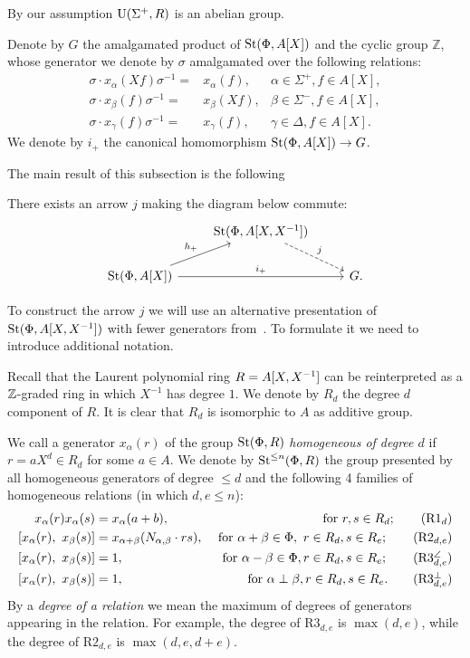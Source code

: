 By our assumption $\operatorname{U}(\Sigma^+, R)$ is an abelian group.

Denote by $G$ the amalgamated product of $\operatorname{St}(\Phi, A[X])$ and the cyclic group $\mathbb{Z}$, whose generator we denote by $\sigma$ amalgamated over the following relations:
\begin{align}
    \sigma \cdot x_{\alpha}(Xf) \sigma^{-1} =& x_{\alpha} (f), & \alpha \in \Sigma^+, f \in A[X], \\
    \sigma \cdot x_{\beta}(f) \sigma^{-1}   =& x_{\beta} (Xf), & \beta \in \Sigma^-, f \in A[X], \\
    \sigma \cdot x_\gamma(f) \sigma^{-1}    =& x_\gamma(f), & \gamma \in \Delta, f \in A[X].
\end{align}
We denote by $i_+$ the canonical homomorphism $\operatorname{St}(\Phi, A[X]) \to G$.

The main result of this subsection is the following
\begin{prop}
    There exists an arrow $j$ making the diagram below commute:
    \[\begin{tikzcd}           & \St(\Phi, A[X, X\inv]) \arrow[rd, dashrightarrow, "j"] & \\
           \St(\Phi, A[X]) \arrow{ru}{h_+} \arrow{rr}{i_+} &                                & G.
    \end{tikzcd}\]
\end{prop}

To construct the arrow $j$ we will use an alternative presentation of $\operatorname{St}(\Phi, A[X, X^{-1}])$ with fewer generators from~\cite{LS20}.
To formulate it we need to introduce additional notation.

Recall that the Laurent polynomial ring $R = A[X, X^{-1}]$ can be reinterpreted as a $\mathbb{Z}$-graded ring in which $X^{-1}$ has degree $1$.
We denote by $R_d$ the degree $d$ component of $R$.
It is clear that $R_d$ is isomorphic to $A$ as additive group.

We call a generator $x_\alpha(r)$ of the group $\operatorname{St}(\Phi, R)$ \textit{homogeneous of degree $d$} if $r = aX^d \in R_d$ for some $a\in A$.
We denote by $\operatorname{St}^{\leq n}(\Phi, R)$ the group presented by all homogeneous generators of degree $\leq d$ and the following 4 families of homogeneous relations (in which $d, e \leq n$):
\begin{align}
    x_{\alpha}(r) x_{\alpha}(s)    &= x_{\alpha}(a + b), & \text{ for } r, s \in R_d; \tag{R$1_d$} \\
    [x_{\alpha}(r),\ x_{\beta}(s)] &= x_{\alpha + \beta}(N_{\alpha, \beta} \cdot rs), &\text{ for } \alpha + \beta \in \Phi,\ r \in R_d, s \in R_e; \tag{R$2_{d, e}$} \\
    [x_{\alpha}(r),\ x_{\beta}(s)] &= 1, &\text{ for }\alpha - \beta \in \Phi, r \in R_d, s \in R_e; \tag{R$3_{d, e}^\angle$} \\
    [x_{\alpha}(r),\ x_{\beta}(s)] &= 1, &\text{ for }\alpha \perp \beta, r \in R_d, s \in R_e. \tag{R$3_{d,e}^\perp$}
\end{align}
By a \textit{degree of a relation} we mean the maximum of degrees of generators appearing in the relation.
For example, the degree of R$3_{d, e}$ is $\max(d, e)$, while the degree of R$2_{d, e}$ is $\max(d, e, d+e).$

